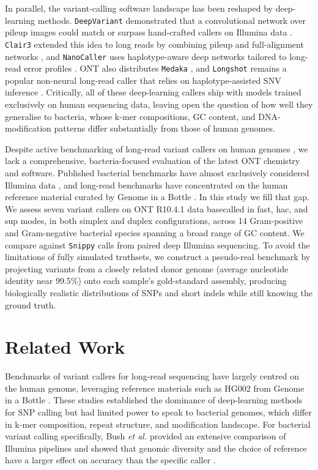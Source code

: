 In parallel, the variant-calling software landscape has been reshaped by deep-learning methods. \texttt{DeepVariant} demonstrated that a convolutional network over pileup images could match or surpass hand-crafted callers on Illumina data \citep{poplin2018deepvariant}. \texttt{Clair3} extended this idea to long reads by combining pileup and full-alignment networks \citep{zheng2022clair3}, and \texttt{NanoCaller} uses haplotype-aware deep networks tailored to long-read error profiles \citep{ahsan2021nanocaller}. ONT also distributes \texttt{Medaka} \citep{ont_medaka}, and \texttt{Longshot} remains a popular non-neural long-read caller that relies on haplotype-assisted SNV inference \citep{edge2019longshot}. Critically, all of these deep-learning callers ship with models trained exclusively on human sequencing data, leaving open the question of how well they generalise to bacteria, whose k-mer compositions, GC content, and DNA-modification patterns differ substantially from those of human genomes.

Despite active benchmarking of long-read variant callers on human genomes \citep{olson2022giab}, we lack a comprehensive, bacteria-focused evaluation of the latest ONT chemistry and software. Published bacterial benchmarks have almost exclusively considered Illumina data \citep{bush2020genomic}, and long-read benchmarks have concentrated on the human reference material curated by Genome in a Bottle \citep{olson2022giab}. In this study we fill that gap. We assess seven variant callers on ONT R10.4.1 data basecalled in fast, hac, and sup modes, in both simplex and duplex configurations, across 14 Gram-positive and Gram-negative bacterial species spanning a broad range of GC content. We compare against \texttt{Snippy} \citep{seemann_snippy} calls from paired deep Illumina sequencing. To avoid the limitations of fully simulated truthsets, we construct a pseudo-real benchmark by projecting variants from a closely related donor genome (average nucleotide identity near 99.5\%) onto each sample's gold-standard assembly, producing biologically realistic distributions of SNPs and short indels while still knowing the ground truth.

\section{Related Work}

Benchmarks of variant callers for long-read sequencing have largely centred on the human genome, leveraging reference materials such as HG002 from Genome in a Bottle \citep{olson2022giab}. These studies established the dominance of deep-learning methods for SNP calling but had limited power to speak to bacterial genomes, which differ in k-mer composition, repeat structure, and modification landscape. For bacterial variant calling specifically, Bush \emph{et al.} provided an extensive comparison of Illumina pipelines and showed that genomic diversity and the choice of reference have a larger effect on accuracy than the specific caller \citep{bush2020genomic}.

